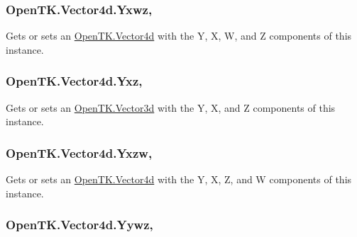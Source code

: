 \hypertarget{struct_open_t_k_1_1_vector4d_aa2e3d3a897d3751676cd2de1a21099f5}{
\subsubsection[{Yxwz}]{ Open\-T\-K.\-Vector4d.\-Yxwz\hspace{0.3cm}{\ttfamily [get]}, {\ttfamily [set]}}}\label{struct_open_t_k_1_1_vector4d_aa2e3d3a897d3751676cd2de1a21099f5}


Gets or sets an \hyperlink{struct_open_t_k_1_1_vector4d}{Open\-T\-K.\-Vector4d} with the Y, X, W, and Z components of this instance. 

\hypertarget{struct_open_t_k_1_1_vector4d_a720d10f2dceaf03b22fb07c2eb71d22e}{
\subsubsection[{Yxz}]{ Open\-T\-K.\-Vector4d.\-Yxz\hspace{0.3cm}{\ttfamily [get]}, {\ttfamily [set]}}}\label{struct_open_t_k_1_1_vector4d_a720d10f2dceaf03b22fb07c2eb71d22e}


Gets or sets an \hyperlink{struct_open_t_k_1_1_vector3d}{Open\-T\-K.\-Vector3d} with the Y, X, and Z components of this instance. 

\hypertarget{struct_open_t_k_1_1_vector4d_af78b309cbef96003bc9c7b85f067376e}{
\subsubsection[{Yxzw}]{ Open\-T\-K.\-Vector4d.\-Yxzw\hspace{0.3cm}{\ttfamily [get]}, {\ttfamily [set]}}}\label{struct_open_t_k_1_1_vector4d_af78b309cbef96003bc9c7b85f067376e}


Gets or sets an \hyperlink{struct_open_t_k_1_1_vector4d}{Open\-T\-K.\-Vector4d} with the Y, X, Z, and W components of this instance. 

\hypertarget{struct_open_t_k_1_1_vector4d_ab67a4a13e1eb79b5093ff6ff2db513f6}{
\subsubsection[{Yywz}]{ Open\-T\-K.\-Vector4d.\-Yywz\hspace{0.3cm}{\ttfamily [get]}, {\ttfamily [set]}}}\label{struct_open_t_k_1_1_vector4d_ab67a4a13e1eb79b5093ff6ff2db513f6}


